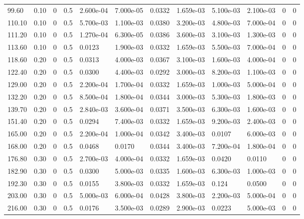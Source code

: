 \documentclass[preview]{standalone}
\begin{document}
{{\begin{tabular}{L{1.2cm}C{1.2cm} C{0.3cm}C{0.5cm} C{1.4cm}C{1.4cm} C{1.4cm}C{1.4cm} C{1.6cm}C{1.6cm} C{1.6cm}C{1.6cm}}
  99.60  &  0.10  & 0     & 0.5 &  2.600e-04  & 7.000e-05  &  0.0332&   1.659e-03& 5.100e-03 & 2.100e-03   &  0 & 0  \\ 
  110.10  &  0.10  & 0     & 0.5 &  5.700e-03  & 1.100e-03  &  0.0380&   3.200e-03& 4.800e-03 & 7.000e-04   &  0 & 0  \\ 
  111.20  &  0.10  & 0     & 0.5 &  1.270e-04  & 6.300e-05  &  0.0386&   3.600e-03& 3.100e-03 & 1.300e-03   &  0 & 0  \\ 
  113.60  &  0.10  & 0     & 0.5 &  0.0123  & 1.900e-03  &  0.0332&   1.659e-03& 5.500e-03 & 7.000e-04   &  0 & 0  \\ 
  118.60  &  0.20  & 0     & 0.5 &  0.0313  & 4.000e-03  &  0.0367&   3.100e-03& 1.600e-03 & 4.000e-04   &  0 & 0  \\ 
  122.40  &  0.20  & 0     & 0.5 &  0.0300  & 4.400e-03  &  0.0292&   3.000e-03& 8.200e-03 & 1.100e-03   &  0 & 0  \\ 
  129.00  &  0.20  & 0     & 0.5 &  2.200e-04  & 1.700e-04  &  0.0332&   1.659e-03& 1.000e-03 & 5.000e-04   &  0 & 0  \\ 
  132.20  &  0.20  & 0     & 0.5 &  8.500e-04  & 1.800e-04  &  0.0344&   3.000e-03& 5.300e-03 & 1.800e-03   &  0 & 0  \\ 
  139.70  &  0.20  & 0     & 0.5 &  2.840e-03  & 3.600e-04  &  0.0371&   3.500e-03& 6.300e-03 & 1.600e-03   &  0 & 0  \\ 
  151.40  &  0.20  & 0     & 0.5 &  0.0294  & 7.400e-03  &  0.0332&   1.659e-03& 9.200e-03 & 2.400e-03   &  0 & 0  \\ 
  165.00  &  0.20  & 0     & 0.5 &  2.200e-04  & 1.000e-04  &  0.0342&   3.400e-03& 0.0107 & 6.000e-03   &  0 & 0  \\ 
  168.00  &  0.20  & 0     & 0.5 &  0.0468  & 0.0170  &  0.0344&   3.400e-03& 7.200e-04 & 1.800e-04   &  0 & 0  \\ 
  176.80  &  0.30  & 0     & 0.5 &  2.700e-03  & 4.000e-04  &  0.0332&   1.659e-03& 0.0420 & 0.0110   &  0 & 0  \\ 
  182.90  &  0.30  & 0     & 0.5 &  0.0300  & 5.000e-03  &  0.0335&   1.600e-03& 6.300e-03 & 1.000e-03   &  0 & 0  \\ 
  192.30  &  0.30  & 0     & 0.5 &  0.0155  & 3.800e-03  &  0.0332&   1.659e-03& 0.124 & 0.0500   &  0 & 0  \\ 
  203.00  &  0.30  & 0     & 0.5 &  5.000e-03  & 6.000e-04  &  0.0428&   3.800e-03& 2.200e-03 & 5.000e-04   &  0 & 0  \\ 
  216.00  &  0.30  & 0     & 0.5 &  0.0176  & 3.500e-03  &  0.0289&   2.900e-03& 0.0223 & 5.000e-03   &  0 & 0  \\ 

\end{tabular}}}
\end{document}
